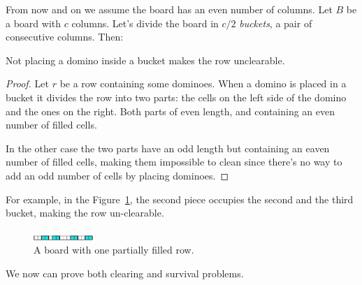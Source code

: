 From now and on we assume the board has an even number of columns. Let $B$ be a board with $c$ columns. Let's divide the board in $c/2$ \emph{buckets}, a pair of consecutive columns. Then:

\begin{lemma0}   
    Not placing a domino inside a bucket makes the row unclearable.
\end{lemma0}
\begin{proof}
    Let $r$ be a row containing some dominoes. When a domino is placed in a bucket it divides the row into two parts: the cells on the left side of the domino and the ones on the right. Both parts of even length, and containing an even number of filled cells.

    In the other case the two parts have an odd length but containing an eaven number of filled cells, making them impossible to clean
    since there's no way to add an odd number of cells by placing dominoes.
\end{proof}

For example, in the Figure~\ref{dom:buckets}, the second piece occupies the second and the third bucket, making the row un-clearable. 

\begin{figure}[h]
    \centering
    \includegraphics[width=0.2\textwidth]{./pictures/dominoes/buckets.pdf}
    \caption{A board with one partially filled row.}
    \label{dom:buckets} 
\end{figure}

We now can prove both clearing and survival problems.

